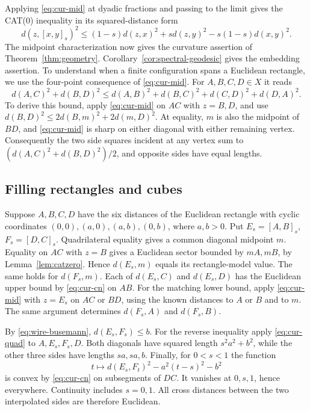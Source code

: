 Applying \eqref{eq:cur-mid} at dyadic fractions and passing to the limit gives the CAT(0) inequality in its squared-distance form
\begin{equation}
 d(z,[x,y]_s)^2\le (1-s)d(z,x)^2+s d(z,y)^2-s(1-s)d(x,y)^2 .
 \label{eq:cur-cn}
\end{equation}
The midpoint characterization \cite[Ch.~II.1]{BH} now gives the curvature
assertion of Theorem~\ref{thm:geometry}. Corollary~\ref{cor:spectral-geodesic}
gives the embedding assertion. To understand when a finite configuration
spans a Euclidean rectangle, we use the four-point consequence of
\eqref{eq:cur-mid}. For $A,B,C,D\in X$ it reads
\begin{equation}
 d(A,C)^2+d(B,D)^2
 \le d(A,B)^2+d(B,C)^2+d(C,D)^2+d(D,A)^2 .
 \label{eq:cur-quad}
\end{equation}
To derive this bound, apply \eqref{eq:cur-mid} on $AC$ with $z=B,D$, and use $d(B,D)^2\le 2d(B,m)^2+2d(m,D)^2$. At equality, $m$ is also the midpoint of $BD$, and \eqref{eq:cur-mid} is sharp on either diagonal with either remaining vertex. Consequently the two side squares incident at any vertex sum to $(d(A,C)^2+d(B,D)^2)/2$, and opposite sides have equal lengths.

\subsection{Filling rectangles and cubes}

Suppose $A,B,C,D$ have the six distances of the Euclidean rectangle with cyclic coordinates $(0,0),(a,0),(a,b),(0,b)$, where $a,b>0$. Put $E_s=[A,B]_s$, $F_s=[D,C]_s$. Quadrilateral equality gives a common diagonal midpoint $m$. Equality on $AC$ with $z=B$ gives a Euclidean sector bounded by $mA,mB$, by Lemma~\ref{lem:catzero}. Hence $d(E_s,m)$ equals its rectangle-model value. The same holds for $d(F_s,m)$. Each of $d(E_s,C)$ and $d(E_s,D)$ has the Euclidean upper bound by \eqref{eq:cur-cn} on $AB$. For the matching lower bound, apply \eqref{eq:cur-mid} with $z=E_s$ on $AC$ or $BD$, using the known distances to $A$ or $B$ and to $m$. The same argument determines $d(F_s,A)$ and $d(F_s,B)$.

By \eqref{eq:wire-busemann}, $d(E_s,F_s)\le b$. For the reverse inequality apply \eqref{eq:cur-quad} to $A,E_s,F_s,D$. Both diagonals have squared length $s^2a^2+b^2$, while the other three sides have lengths $sa,sa,b$. Finally, for $0<s<1$ the function
\[
 t\longmapsto d(E_s,F_t)^2-a^2(t-s)^2-b^2
\]
is convex by \eqref{eq:cur-cn} on subsegments of $DC$. It vanishes at $0,s,1$, hence everywhere. Continuity includes $s=0,1$. All cross distances between the two interpolated sides are therefore Euclidean.

